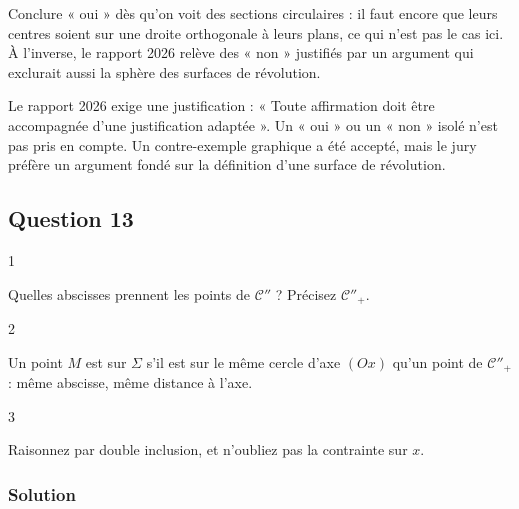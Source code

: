 \documentclass[11pt,a4paper]{article}
\begin{document}
\begin{piege}

Conclure « oui » dès qu'on voit des sections circulaires : il faut encore que leurs centres soient sur une droite orthogonale à leurs plans, ce qui n'est pas le cas ici. À l'inverse, le rapport 2026 relève des « non » justifiés par un argument qui exclurait aussi la sphère des surfaces de révolution.

\end{piege}

\begin{jury}

Le rapport 2026 exige une justification : « Toute affirmation doit être accompagnée d'une justification adaptée ». Un « oui » ou un « non » isolé n'est pas pris en compte. Un contre-exemple graphique a été accepté, mais le jury préfère un argument fondé sur la définition d'une surface de révolution.

\end{jury}

\hypertarget{question-13-1}{%
\subsection{Question 13}\label{question-13-1}}

\begin{indication}{1}

Quelles abscisses prennent les points de \(\mathcal{C}''\) ? Précisez \(\mathcal{C}''_+\).

\end{indication}

\begin{indication}{2}

Un point \(M\) est sur \(\Sigma\) s'il est sur le même cercle d'axe \((Ox)\) qu'un point de \(\mathcal{C}''_+\) : même abscisse, même distance à l'axe.

\end{indication}

\begin{indication}{3}

Raisonnez par double inclusion, et n'oubliez pas la contrainte sur \(x\).

\end{indication}

\hypertarget{solution-36}{%
\subsubsection{Solution}\label{solution-36}}
\end{document}

